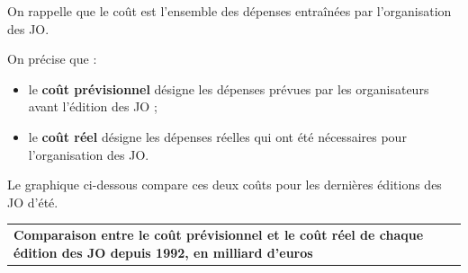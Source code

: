 \documentclass[11pt]{article}
\begin{document}
On rappelle que le coût est l'ensemble des dépenses entraînées par l'organisation des JO.

On précise que :

\begin{itemize}
\item le \textbf{coût prévisionnel} désigne les dépenses prévues par les organisateurs avant l'édition des JO ;
\item le \textbf{coût réel} désigne les dépenses réelles qui ont été nécessaires pour l'organisation des JO.
\end{itemize}

Le graphique ci-dessous compare ces deux coûts pour les dernières éditions des JO d'été.

\medskip

\begin{tabularx}{\linewidth}{|>{\centering \arraybackslash}X|}\hline
\textbf{Comparaison entre le coût prévisionnel et le coût réel de chaque édition des JO depuis 1992, en milliard d'euros}\\


\end{tabularx}
\end{document}
